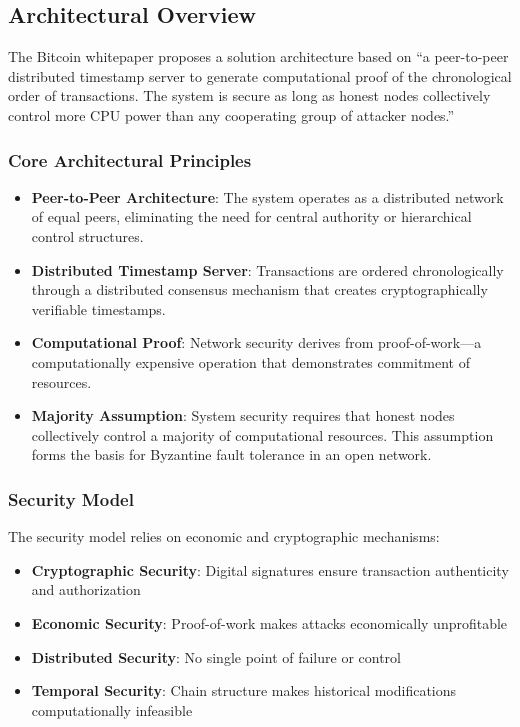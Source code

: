 \subsection{Architectural Overview}
\label{subsec:arch-overview}

The Bitcoin whitepaper proposes a solution architecture based on ``a peer-to-peer distributed timestamp server to generate computational proof of the chronological order of transactions. The system is secure as long as honest nodes collectively control more CPU power than any cooperating group of attacker nodes.''

\subsubsection{Core Architectural Principles}

\begin{itemize}
  \item \textbf{Peer-to-Peer Architecture}: The system operates as a distributed network of equal peers, eliminating the need for central authority or hierarchical control structures.

  \item \textbf{Distributed Timestamp Server}: Transactions are ordered chronologically through a distributed consensus mechanism that creates cryptographically verifiable timestamps.

  \item \textbf{Computational Proof}: Network security derives from proof-of-work---a computationally expensive operation that demonstrates commitment of resources.

  \item \textbf{Majority Assumption}: System security requires that honest nodes collectively control a majority of computational resources. This assumption forms the basis for Byzantine fault tolerance in an open network.
\end{itemize}

\subsubsection{Security Model}

The security model relies on economic and cryptographic mechanisms:

\begin{itemize}
  \item \textbf{Cryptographic Security}: Digital signatures ensure transaction authenticity and authorization
  \item \textbf{Economic Security}: Proof-of-work makes attacks economically unprofitable
  \item \textbf{Distributed Security}: No single point of failure or control
  \item \textbf{Temporal Security}: Chain structure makes historical modifications computationally infeasible
\end{itemize}

